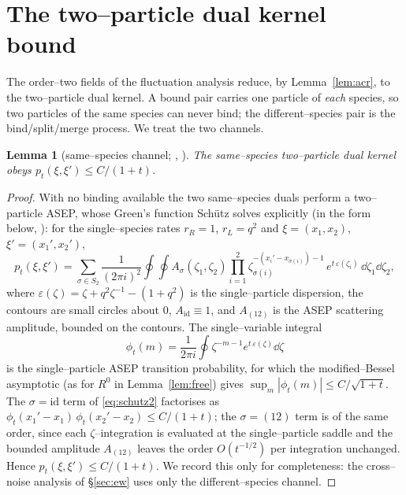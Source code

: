 \documentclass[11pt]{article}
\theoremstyle{plain}
\newtheorem{lemma}[theorem]{Lemma}
\theoremstyle{definition}
\theoremstyle{remark}
\begin{document}
\section{The two--particle dual kernel bound}\label{sec:kernel}

The order--two fields of the fluctuation analysis reduce, by Lemma~\ref{lem:acr}, to
the two--particle dual kernel. A bound pair carries one particle of \emph{each}
species, so two particles of the same species can never bind; the different--species
pair is the bind/split/merge process. We treat the two channels.

\begin{lemma}[same--species channel; {\cite{Schutz}}, {\cite{TW08}}]\label{lem:asep}
The same--species two--particle dual kernel obeys $p_t(\xi,\xi')\le C/(1+t)$.
\end{lemma}
\begin{proof}
With no binding available the two same--species duals perform a two--particle ASEP, whose
Green's function Sch\"utz solves explicitly \cite{Schutz} (in the form below, \cite{TW08}):
for the single--species rates $r_R=1$, $r_L=q^2$ and $\xi=(x_1,x_2)$, $\xi'=(x_1',x_2')$,
\begin{equation}\label{eq:schutz2}
  p_t(\xi,\xi')=\sum_{\sigma\in S_2}\frac1{(2\pi i)^2}\oint\!\!\oint
  A_\sigma(\zeta_1,\zeta_2)\prod_{i=1}^2
  \zeta_{\sigma(i)}^{-(x_i'-x_{\sigma(i)})-1}\,e^{t\,\varepsilon(\zeta_i)}\,\dd\zeta_1\dd\zeta_2,
\end{equation}
where $\varepsilon(\zeta)=\zeta+q^2\zeta^{-1}-(1+q^2)$ is the single--particle dispersion,
the contours are small circles about $0$, $A_{\mathrm{id}}\equiv1$, and $A_{(12)}$ is the
ASEP scattering amplitude, bounded on the contours. The single--variable integral
\[
  \phi_t(m)=\frac1{2\pi i}\oint \zeta^{-m-1}e^{t\,\varepsilon(\zeta)}\dd\zeta
\]
is the single--particle ASEP transition probability, for which the modified--Bessel
asymptotic (as for $R^0$ in Lemma~\ref{lem:free}) gives $\sup_m|\phi_t(m)|\le C/\sqrt{1+t}$.
The $\sigma=\mathrm{id}$ term of \eqref{eq:schutz2} factorises as
$\phi_t(x_1'-x_1)\,\phi_t(x_2'-x_2)\le C/(1+t)$; the $\sigma=(12)$ term is of the same
order, since each $\zeta$--integration is evaluated at the single--particle saddle and the
bounded amplitude $A_{(12)}$ leaves the order $O(t^{-1/2})$ per integration unchanged.
Hence $p_t(\xi,\xi')\le C/(1+t)$. We record this only for completeness: the cross--noise
analysis of \S\ref{sec:ew} uses only the different--species channel.
\end{proof}
\end{document}
